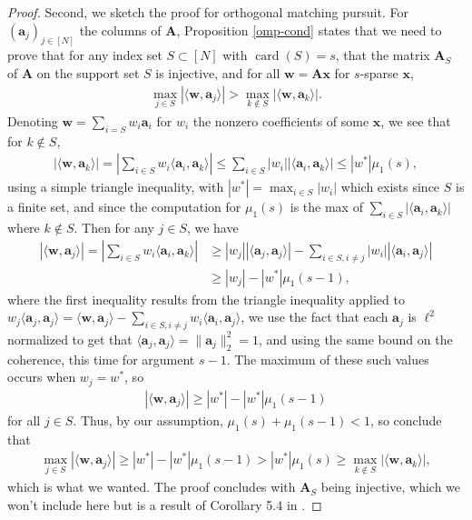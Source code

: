 \documentclass[12pt,a4paper]{amsart}
\numberwithin{equation}{section}
\theoremstyle{plain}
\theoremstyle{definition}
\newcommand{\bdx}{\mathbf{x}}
\newcommand{\bda}{\mathbf{a}}
\newcommand{\bdw}{\mathbf{w}}
\newcommand{\bdA}{\mathbf{A}}
\DeclareMathOperator{\card}{card}
\begin{document}
\begin{proof}
    Second, we sketch the proof for orthogonal matching pursuit. For $(\bda_j)_{j\in[N]}$ the columns of $\bdA$, Proposition \ref{omp-cond} states that we need to prove that for any index set $S\subset[N]$ with $\card(S)=s$, that the matrix $\bdA_S$ of $\bdA$ on the support set $S$ is injective, and for all $\bdw=\bdA\bdx$ for $s$-sparse $\bdx$, 
    \begin{align*}
        \max_{j\in S}|\langle\bdw,\bda_j\rangle|>\max_{k\notin S}|\langle\bdw,\bda_k\rangle|.
    \end{align*}
    Denoting $\bdw=\sum_{i=S}w_i\bda_i$ for $w_i$ the nonzero coefficients of some $\bdx$, we see that for $k\notin S$,
    \begin{align*}
        |\langle\bdw,\bda_k\rangle|=\left|\sum_{i\in S}w_i\langle\bda_i,\bda_k\rangle\right|\leq\sum_{i\in S}|w_i||\langle\bda_i,\bda_k\rangle|\leq|w^*|\mu_1(s),
    \end{align*}
    using a simple triangle inequality, with $|w^*|=\max_{i\in S}|w_i|$ which exists since $S$ is a finite set, and since the computation for $\mu_1(s)$ is the max of $\sum_{i\in S}|\langle\bda_i,\bda_k\rangle|$ where $k\notin S$. Then for any $j\in S$, we have
    \begin{align*}
        |\langle\bdw,\bda_j\rangle|=\left|\sum_{i\in S}w_i\langle\bda_i,\bda_k\rangle\right|&\geq|w_j||\langle\bda_j,\bda_j\rangle|-\sum_{i\in S,i\neq j}|w_i||\langle\bda_i,\bda_j\rangle|\\&\geq|w_j|-|w^*|\mu_1(s-1),
    \end{align*}
    where the first inequality results from the triangle inequality applied to $w_j\langle\bda_j,\bda_j\rangle=\langle\bdw,\bda_j\rangle-\sum_{i\in S,i\neq j}w_i\langle\bda_i,\bda_j\rangle$, we use the fact that each $\bda_j$ is $\ell^2$ normalized to get that $\langle \bda_j,\bda_j\rangle=\|\bda_j\|_2^2=1$, and using the same bound on the coherence, this time for argument $s-1$. The maximum of these such values occurs when $w_j=w^*$, so 
    \begin{align*}
        |\langle\bdw,\bda_j\rangle|\geq|w^*|-|w^*|\mu_1(s-1)
    \end{align*}
    for all $j\in S$. Thus, by our assumption, $\mu_1(s)+\mu_1(s-1)<1$, so conclude that 
    \begin{align*}
        \max_{j\in S}|\langle\bdw,\bda_j\rangle|\geq|w^*|-|w^*|\mu_1(s-1)>|w^*|\mu_1(s)\geq\max_{k\notin S}|\langle\bdw,\bda_k\rangle|,
    \end{align*}
    which is what we wanted. The proof concludes with $\bdA_S$ being injective, which we won't include here but is a result of Corollary 5.4 in \cite{fou-rau}.
\end{proof}
\end{document}
